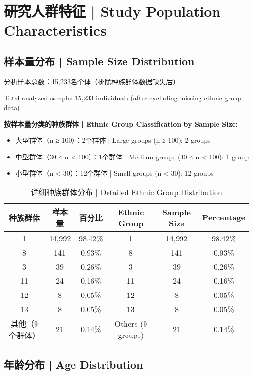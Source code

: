 \documentclass[12pt,a4paper]{article}
\begin{document}
\section{研究人群特征 | Study Population Characteristics}

\subsection{样本量分布 | Sample Size Distribution}

分析样本总数：15,233名个体（排除种族群体数据缺失后）

Total analyzed sample: 15,233 individuals (after excluding missing ethnic group data)

\textbf{按样本量分类的种族群体 | Ethnic Group Classification by Sample Size:}
\begin{itemize}
    \item 大型群体（n ≥ 100）：2个群体 | Large groups (n ≥ 100): 2 groups
    \item 中型群体（30 ≤ n < 100）：1个群体 | Medium groups (30 ≤ n < 100): 1 group
    \item 小型群体（n < 30）：12个群体 | Small groups (n < 30): 12 groups
\end{itemize}

\begin{table}[H]
\centering
\caption{详细种族群体分布 | Detailed Ethnic Group Distribution}
\begin{tabular}{@{}cccccc@{}}
\toprule
\textbf{种族群体} & \textbf{样本量} & \textbf{百分比} & \textbf{Ethnic Group} & \textbf{Sample Size} & \textbf{Percentage} \\
\midrule
1 & 14,992 & 98.42\% & 1 & 14,992 & 98.42\% \\
8 & 141 & 0.93\% & 8 & 141 & 0.93\% \\
3 & 39 & 0.26\% & 3 & 39 & 0.26\% \\
11 & 24 & 0.16\% & 11 & 24 & 0.16\% \\
12 & 8 & 0.05\% & 12 & 8 & 0.05\% \\
13 & 8 & 0.05\% & 13 & 8 & 0.05\% \\
其他（9个群体） & 21 & 0.14\% & Others (9 groups) & 21 & 0.14\% \\
\bottomrule
\end{tabular}
\end{table}

\subsection{年龄分布 | Age Distribution}
\end{document}
